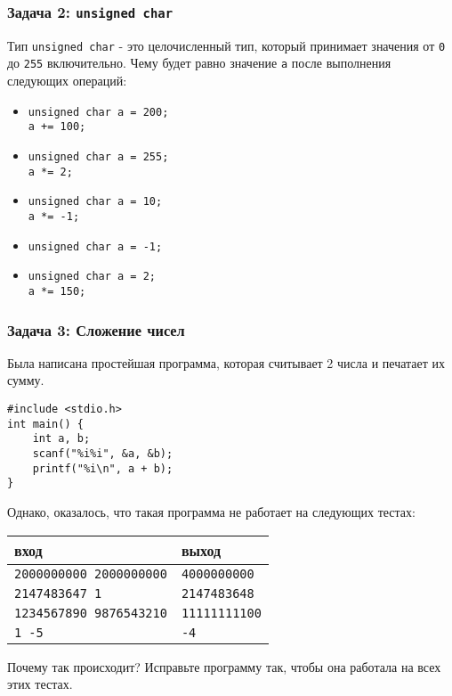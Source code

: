 \documentclass{article}
\begin{document}
\subsubsection*{Задача 2: \texttt{unsigned char}}
Тип \texttt{unsigned char} - это целочисленный тип, который принимает значения от \texttt{0} до \texttt{255} включительно.
Чему будет равно значение \texttt{a} после выполнения следующих операций:
\begin{itemize}
\item 
\begin{verbatim}
unsigned char a = 200;
a += 100;
\end{verbatim}
\item
\begin{verbatim}
unsigned char a = 255;
a *= 2;
\end{verbatim}
\item
\begin{verbatim}
unsigned char a = 10;
a *= -1;
\end{verbatim}
\item
\begin{verbatim}
unsigned char a = -1;
\end{verbatim}
\item
\begin{verbatim}
unsigned char a = 2;
a *= 150;
\end{verbatim}
\end{itemize}


\subsubsection*{Задача 3: Сложение чисел}
Была написана простейшая программа, которая считывает 2 числа и печатает их сумму.
\begin{lstlisting}
#include <stdio.h>
int main() {
	int a, b;
	scanf("%i%i", &a, &b);
	printf("%i\n", a + b);
}
\end{lstlisting}
Однако, оказалось, что такая программа не работает на следующих тестах:
\begin{center}
\begin{tabular}{ l l }
 вход & выход \\ \hline
 \texttt{2000000000 2000000000} & \texttt{4000000000}  \\ 
 \texttt{2147483647 1} & \texttt{2147483648}  \\
 \texttt{1234567890 9876543210} & \texttt{11111111100} \\
 \texttt{1 -5} & \texttt{-4} \\
\end{tabular}
\end{center}
Почему так происходит? Исправьте программу так, чтобы она работала на всех этих тестах. \\
\end{document}
